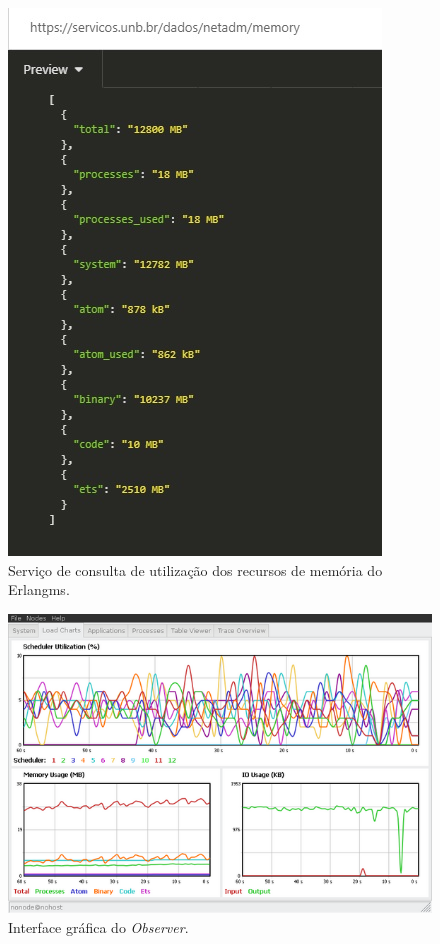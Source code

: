 \begin{figure}[h!]
	\begin{center}
	\includegraphics[scale = 0.90]{img/monitoramentoEMS.jpg}
		\caption{Serviço de consulta de utilização dos recursos de memória do Erlangms.}
		\label{fun:fig:memoriaEMS}
	\end{center}
\end{figure}

\begin{figure}[h!]
	\begin{center}
	\includegraphics[scale = 0.70]{img/observerGo.jpg}
		\caption{Interface gráfica do \textit{Observer}.}
		\label{fun:fig:observer}
	\end{center}
\end{figure}

